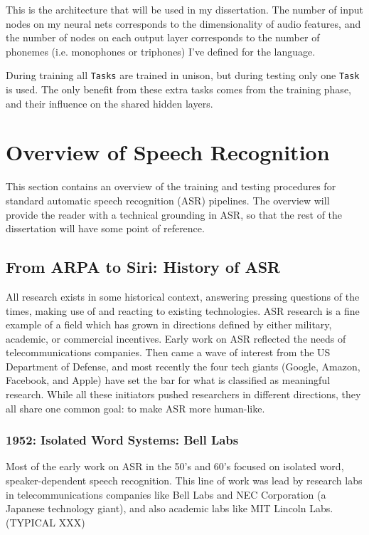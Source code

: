 \documentclass[10pt,a4paper]{article}
\begin{document}
This is the architecture that will be used in my dissertation. The number of input nodes on my neural nets corresponds to the dimensionality of audio features, and the number of nodes on each output layer corresponds to the number of phonemes (i.e. monophones or triphones) I've defined for the language.

During training all \texttt{Tasks} are trained in unison, but during testing only one \texttt{Task} is used. The only benefit from these extra tasks comes from the training phase, and their influence on the shared hidden layers.






\newpage

\section{Overview of Speech Recognition}

This section contains an overview of the training and testing procedures for standard automatic speech recognition (ASR) pipelines. The overview will provide the reader with a technical grounding in ASR, so that the rest of the dissertation will have some point of reference. 

\subsection{From ARPA to Siri: History of ASR}

All research exists in some historical context, answering pressing questions of the times, making use of and reacting to existing technologies. ASR research is a fine example of a field which has grown in directions defined by either military, academic, or commercial incentives. Early work on ASR reflected the needs of telecommunications companies. Then came a wave of interest from the US Department of Defense, and most recently the four tech giants (Google, Amazon, Facebook, and Apple) have set the bar for what is classified as meaningful research. While all these initiators pushed researchers in different directions, they all share one common goal: to make ASR more human-like.

\subsubsection{1952: Isolated Word Systems: Bell Labs}
Most of the early work on ASR in the 50's and 60's focused on isolated word, speaker-dependent speech recognition. This line of work was lead by research labs in telecommunications companies like Bell Labs and NEC Corporation (a Japanese technology giant), and also academic labs like MIT Lincoln Labs. (TYPICAL XXX)
\end{document}
